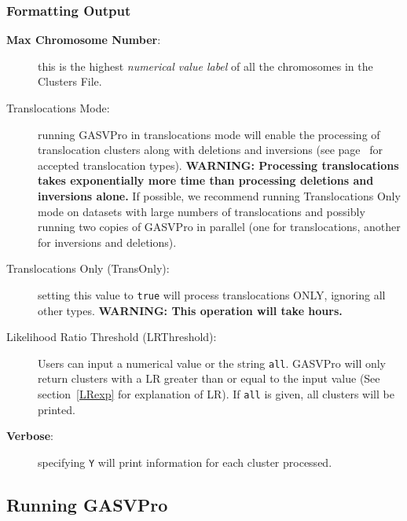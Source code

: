 \documentclass[11pt]{article}
\begin{document}
\subsubsection{Formatting Output}
\begin{description}
\item[{\bf Max Chromosome Number}:]  this is the highest {\em numerical value label} of all the chromosomes in the Clusters File.
\item[Translocations Mode:] running GASVPro in translocations mode will enable the processing of translocation clusters along with deletions and inversions (see page~\pageref{structvartypes} for accepted translocation types). {\bf WARNING: Processing translocations takes exponentially more time than processing deletions and inversions alone.} If possible, we recommend running Translocations Only mode on datasets with large numbers of translocations and possibly running two copies of GASVPro in parallel (one for translocations, another for inversions and deletions).
\item[Translocations Only (TransOnly):] setting this value to \verb+true+ will process translocations ONLY, ignoring all other types. {\bf WARNING: This operation will take hours.}
\item[Likelihood Ratio Threshold (LRThreshold):] Users can input a numerical value or the string \verb+all+. GASVPro will only return clusters with a LR greater than or equal to the input value (See section~\ref{LRexp} for explanation of LR). If \verb+all+ is given, all clusters will be printed.
\item[{\bf Verbose}:] specifying \verb+Y+ will print information for each cluster processed. 
\end{description}

\subsection{Running GASVPro}
\end{document}
